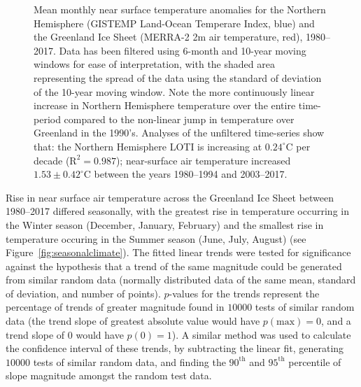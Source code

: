 \documentclass[11pt]{report}
\begin{document}
 \begin{figure}[h]
\centering
{}
\caption[Near surface warming of the Northern Hemisphere and Greenland Ice Sheet]{Mean monthly near surface temperature anomalies for the Northern Hemisphere (GISTEMP Land-Ocean Temperare Index, blue) and the Greenland Ice Sheet (MERRA-2 2m air temperature, red), 1980--2017. Data has been filtered using 6-month and 10-year moving windows for ease of interpretation, with the shaded area representing the spread of the data using the standard of deviation of the 10-year moving window. Note the more continuously linear increase in Northern Hemisphere temperature over the entire time-period compared to the non-linear jump in temperature over Greenland in the 1990's. Analyses of the unfiltered time-series show that: the Northern Hemisphere LOTI is increasing at $0.24^{\circ}$C per decade ($\mathrm{R^2}=0.987$); near-surface air temperature increased $1.53\pm0.42^{\circ}$C between the years 1980--1994 and 2003--2017.} \label{fig:climatewarming}
\end{figure}


Rise in near surface air temperature across the Greenland Ice Sheet between 1980--2017 differed seasonally, with the greatest rise in temperature occurring in the Winter season (December, January, February) and the smallest rise in temperature occuring in the Summer season (June, July, August) (see Figure~\ref{fig:seasonalclimate}). The fitted linear trends were tested for significance against the hypothesis that a trend of the same magnitude could be generated from similar random data (normally distributed data of the same mean, standard of deviation, and number of points). $p$-values for the trends represent the percentage of trends of greater magnitude found in $10000$ tests of similar random data (the trend slope of greatest absolute value would have $p(\mathrm{max}) = 0$, and a trend slope of $0$ would have $p(0) = 1$). A similar method was used to calculate the confidence interval of these trends, by subtracting the linear fit, generating $10000$ tests of similar random data, and finding the $90^{\mathrm{th}}$ and $95^{\mathrm{th}}$ percentile of slope magnitude amongst the random test data. 
\end{document}
